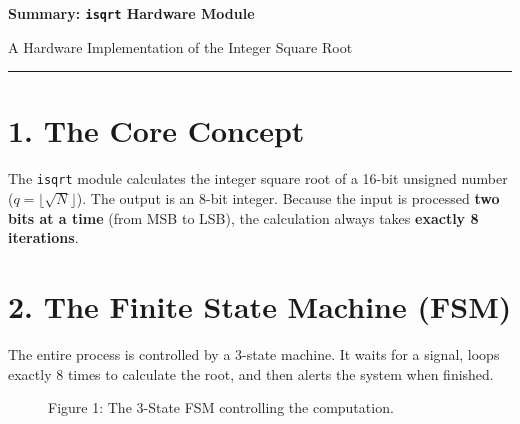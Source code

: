 \documentclass[12pt,a4paper]{article}
\begin{document}
\begin{center}
    {\LARGE\bfseries Summary: \texttt{isqrt} Hardware Module\par}
    \vspace{0.2cm}
    {\large A Hardware Implementation of the Integer Square Root\par}
    \vspace{0.4cm}
    {\color{clrGray}\rule{8cm}{0.5pt}\par}
\end{center}

\section*{1. The Core Concept}
The \texttt{isqrt} module calculates the integer square root of a 16-bit unsigned number ($q = \lfloor\sqrt{N}\rfloor$). The output is an 8-bit integer. Because the input is processed \textbf{two bits at a time} (from MSB to LSB), the calculation always takes \textbf{exactly 8 iterations}.

\section*{2. The Finite State Machine (FSM)}
The entire process is controlled by a 3-state machine. It waits for a signal, loops exactly 8 times to calculate the root, and then alerts the system when finished.

\begin{figure}[H]
\centering
{}
\caption*{Figure 1: The 3-State FSM controlling the computation.}
\end{figure}
\end{document}
